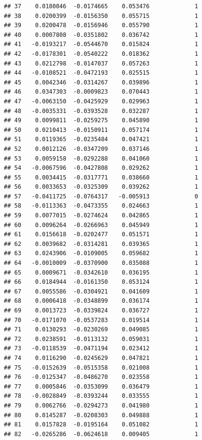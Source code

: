 \documentclass[12pt]{article}\usepackage[]{graphicx}\usepackage[]{xcolor}
\makeatletter
\newenvironment{kframe}{%
 \def\at@end@of@kframe{}%
 \ifinner\ifhmode%
  \def\at@end@of@kframe{\end{minipage}}%
  \begin{minipage}{\columnwidth}%
 \fi\fi%
 \def\FrameCommand##1{\hskip\@totalleftmargin \hskip-\fboxsep
 \colorbox{shadecolor}{##1}\hskip-\fboxsep
     \hskip-\linewidth \hskip-\@totalleftmargin \hskip\columnwidth}%
 \MakeFramed {\advance\hsize-\width
   \@totalleftmargin\z@ \linewidth\hsize
   \@setminipage}}%
 {\par\unskip\endMakeFramed%
 \at@end@of@kframe}
\newenvironment{knitrout}{}{} %
\makeatother
\begin{document}
\begin{knitrout}
\begin{kframe}
\begin{verbatim}
## 37    0.0180046  -0.0174665    0.053476             1
## 38    0.0200399  -0.0156350    0.055715             1
## 39    0.0200478  -0.0156946    0.055790             1
## 40    0.0007808  -0.0351802    0.036742             1
## 41   -0.0193217  -0.0544670    0.015824             1
## 42   -0.0178301  -0.0540222    0.018362             1
## 43    0.0212798  -0.0147037    0.057263             1
## 44   -0.0108521  -0.0472193    0.025515             1
## 45    0.0042346  -0.0314267    0.039896             1
## 46    0.0347303  -0.0009823    0.070443             1
## 47   -0.0063150  -0.0425929    0.029963             1
## 48   -0.0035331  -0.0393528    0.032287             1
## 49    0.0099811  -0.0259275    0.045890             1
## 50    0.0210413  -0.0150911    0.057174             1
## 51    0.0119365  -0.0235484    0.047421             1
## 52    0.0012126  -0.0347209    0.037146             1
## 53    0.0059158  -0.0292288    0.041060             1
## 54   -0.0067596  -0.0427808    0.029262             1
## 55    0.0034415  -0.0317771    0.038660             1
## 56    0.0033653  -0.0325309    0.039262             1
## 57   -0.0411725  -0.0764317   -0.005913             0
## 58   -0.0113363  -0.0473355    0.024663             1
## 59    0.0077015  -0.0274624    0.042865             1
## 60    0.0096264  -0.0266963    0.045949             1
## 61    0.0156618  -0.0202477    0.051571             1
## 62    0.0039682  -0.0314281    0.039365             1
## 63    0.0243906  -0.0109005    0.059682             1
## 64   -0.0010009  -0.0370900    0.035088             1
## 65    0.0009671  -0.0342610    0.036195             1
## 66    0.0184944  -0.0161350    0.053124             1
## 67    0.0055586  -0.0304921    0.041609             1
## 68    0.0006418  -0.0348899    0.036174             1
## 69    0.0013723  -0.0339824    0.036727             1
## 70   -0.0171070  -0.0537283    0.019514             1
## 71    0.0130293  -0.0230269    0.049085             1
## 72    0.0238591  -0.0113132    0.059031             1
## 73   -0.0118539  -0.0471194    0.023412             1
## 74    0.0116290  -0.0245629    0.047821             1
## 75   -0.0152639  -0.0515358    0.021008             1
## 76   -0.0125347  -0.0486270    0.023558             1
## 77    0.0005846  -0.0353099    0.036479             1
## 78   -0.0028849  -0.0393244    0.033555             1
## 79    0.0062766  -0.0294273    0.041980             1
## 80    0.0145287  -0.0208303    0.049888             1
## 81    0.0157828  -0.0195164    0.051082             1
## 82   -0.0265286  -0.0624618    0.009405             1

\end{verbatim}
\end{kframe}
\end{knitrout}
\end{document}
